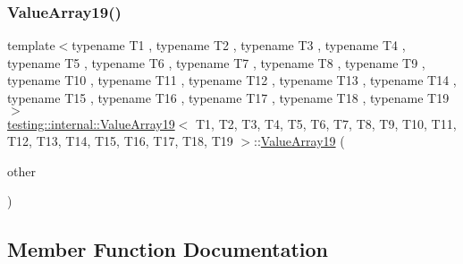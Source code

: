 \subsubsection{\texorpdfstring{ValueArray19()}{ValueArray19()}\hspace{0.1cm}{\footnotesize\ttfamily [2/2]}}
{\footnotesize\ttfamily template$<$typename T1 , typename T2 , typename T3 , typename T4 , typename T5 , typename T6 , typename T7 , typename T8 , typename T9 , typename T10 , typename T11 , typename T12 , typename T13 , typename T14 , typename T15 , typename T16 , typename T17 , typename T18 , typename T19 $>$ \\
\mbox{\hyperlink{classtesting_1_1internal_1_1ValueArray19}{testing\+::internal\+::\+Value\+Array19}}$<$ T1, T2, T3, T4, T5, T6, T7, T8, T9, T10, T11, T12, T13, T14, T15, T16, T17, T18, T19 $>$\+::\mbox{\hyperlink{classtesting_1_1internal_1_1ValueArray19}{Value\+Array19}} (\begin{DoxyParamCaption}\item[{const \mbox{\hyperlink{classtesting_1_1internal_1_1ValueArray19}{Value\+Array19}}$<$ T1, T2, T3, T4, T5, T6, T7, T8, T9, T10, T11, T12, T13, T14, T15, T16, T17, T18, T19 $>$ \&}]{other }\end{DoxyParamCaption})\hspace{0.3cm}{\ttfamily [inline]}}



\subsection{Member Function Documentation}
\mbox{\label{classtesting_1_1internal_1_1ValueArray19_a8ddd6c1de46e25310cf844895c7c8cf6}} 

